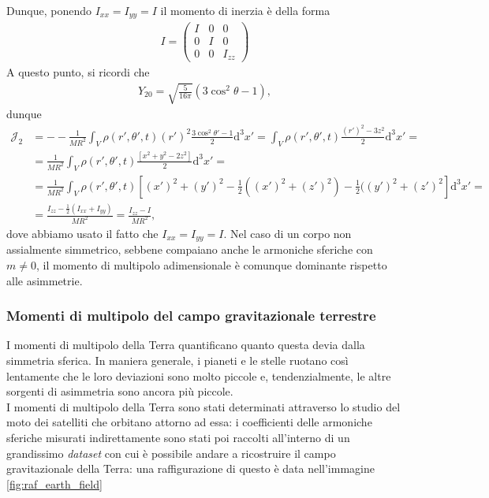 Dunque, ponendo $I_{xx} = I_{yy} = I$ il momento di inerzia è della forma
\begin{align}
	I = \begin{pmatrix} 
		I & 0 & 0 \\
		0 & I & 0 \\
		0 & 0 & I_{zz}
	\end{pmatrix}
\end{align}
A questo punto, si ricordi che
\begin{align}
	Y_{20} = \sqrt{\frac{5}{16 \pi}}(3 \cos^2{\theta} - 1),
\end{align}
dunque
\begin{align}
	\mathcal{J}_2 &= - -\frac{1}{MR^2} \int_V \rho(r', \theta', t) (r')^2 \frac{3 \cos^2{\theta'} - 1}{2} \mathrm{d}^3 x' = \int_V \rho(r', \theta', t) \frac{(r')^2 - 3z^2}{2} \mathrm{d}^3 x' = \nonumber \\ &=\frac{1}{MR^2} \int_V \rho(r', \theta', t) \frac{\left[ x^2 + y^2 - 2z^2 \right]}{2} \mathrm{d}^3 x' = \nonumber \\
		      &=\frac{1}{MR^2} \int_V \rho(r', \theta', t) \left[ (x')^2 + (y')^2 - \frac{1}{2}((x')^2 + (z')^2) - \frac{1}{2}((y')^2 + (z')^2 \right] \mathrm{d}^3 x' = \nonumber \\
	&= \frac{I_{zz} - \frac{1}{2}\left( I_{xx} + I_{yy} \right)}{MR^2} =\frac{I_{zz} - I}{MR^2},
\end{align}
dove abbiamo usato il fatto che $I_{xx} = I_{yy} = I$. Nel caso di un corpo non assialmente simmetrico, sebbene compaiano anche le armoniche sferiche con $m \neq 0$, il momento di multipolo adimensionale è comunque dominante rispetto alle asimmetrie.


\subsubsection{Momenti di multipolo del campo gravitazionale terrestre}

I momenti di multipolo della Terra quantificano quanto questa devia dalla simmetria sferica. In maniera generale, i pianeti e le stelle ruotano così lentamente che le loro deviazioni sono molto piccole e, tendenzialmente, le altre sorgenti di asimmetria sono ancora più piccole. \\
I momenti di multipolo della Terra sono stati determinati attraverso lo studio del moto dei satelliti che orbitano attorno ad essa: i coefficienti delle armoniche sferiche misurati indirettamente sono stati poi raccolti all'interno di un grandissimo \emph{dataset} con cui è possibile andare a ricostruire il campo gravitazionale della Terra: una raffigurazione di questo è data nell'immagine \ref{fig:raf_earth_field}

